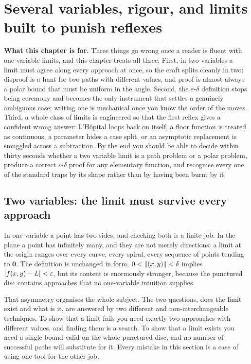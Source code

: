 \chapter{Several variables, rigour, and limits built to punish reflexes}

\begin{orient}
\textbf{What this chapter is for.} Three things go wrong once a reader is fluent with one variable limits, and this chapter treats all three. First, in two variables a limit must agree along every approach at once, so the craft splits cleanly in two: disproof is a hunt for two paths with different values, and proof is almost always a polar bound that must be uniform in the angle. Second, the $\varepsilon$-$\delta$ definition stops being ceremony and becomes the only instrument that settles a genuinely ambiguous case; writing one is mechanical once you know the order of the moves. Third, a whole class of limits is engineered so that the first reflex gives a confident wrong answer: L'H\^opital loops back on itself, a floor function is treated as continuous, a parameter hides a case split, or an asymptotic replacement is smuggled across a subtraction. By the end you should be able to decide within thirty seconds whether a two variable limit is a path problem or a polar problem, produce a correct $\varepsilon$-$\delta$ proof for any elementary function, and recognise every one of the standard traps by its shape rather than by having been burnt by it.
\end{orient}

\section{Two variables: the limit must survive every approach}

In one variable a point has two sides, and checking both is a finite job. In the plane a point has infinitely many, and they are not merely directions: a limit at the origin ranges over every curve, every spiral, every sequence of points tending to $\mathbf 0$. The definition is unchanged in form, $0<\left\lVert (x,y)\right\rVert<\delta$ implies $\left\lvert f(x,y)-L\right\rvert<\varepsilon$, but its content is enormously stronger, because the punctured disc contains approaches that no one-variable intuition supplies.

That asymmetry organises the whole subject. The two questions, does the limit exist and what is it, are answered by two different and non-interchangeable techniques. To show that a limit fails you need exactly two approaches with different values, and finding them is a search. To show that a limit exists you need a single bound valid on the whole punctured disc, and no number of successful paths will substitute for it. Every mistake in this section is a case of using one tool for the other job.

